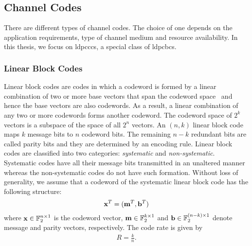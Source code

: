 \subsection{Channel Codes}
There are different types of channel codes. The choice of one depends on the application requirements, type of channel medium and resource availability. In this thesis, we focus on \acp{ldpccc}, a special class of \acp{ldpcbc}.
\subsubsection{Linear Block Codes}
Linear block codes are codes in which a codeword is formed by a linear combination of two or more base vectors that span the codeword space~\cite{proak} and hence the base vectors are also codewords. As a result, a linear combination of any two or more codewords forms another codeword. The codeword space of $2^k$ vectors is a subspace of the space of all $2^n$ vectors. An $(n,k)$ linear block code maps $k$ message bits to $n$ codeword bits. The remaining $n-k$ redundant bits are called parity bits and they are determined by an encoding rule. Linear block codes are classified into two categories: \emph{systematic} and \emph{non-systematic}. Systematic codes have all their message bits transmitted in an unaltered manner whereas the non-systematic codes do not have such formation. Without loss of generality, we assume that a codeword of the systematic linear block code has the following structure: \begin{align}\mathbf{x}^T=(\mathbf{m}^T,\mathbf{b}^T)\end{align} where $\mathbf{x}\in\mathbb{F}_2^{n\times 1}$ is the codeword vector, $\mathbf{m}\in\mathbb{F}_2^{k\times 1}$ and $\mathbf{b}\in\mathbb{F}_2^{(n-k)\times 1}$ denote message and parity vectors, respectively. The code rate is given by \begin{align}R=\frac{k}{n}.\end{align}

